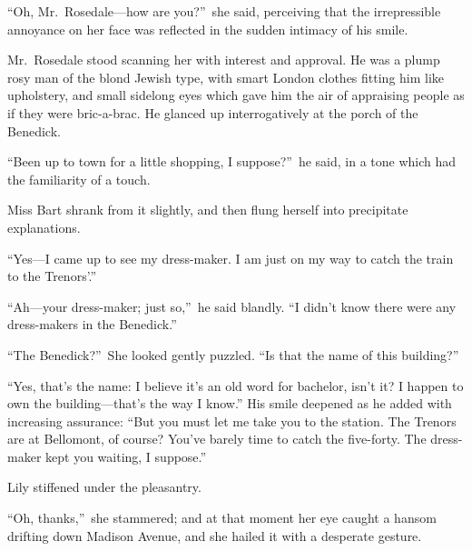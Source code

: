 \documentclass[12pt,a4paper]{book}
\begin{document}
``Oh, Mr.\ Rosedale---how are you?''\ she said, perceiving that the
irrepressible annoyance on her face was reflected in the sudden
intimacy of his smile.





Mr.\ Rosedale stood scanning her with interest and approval. He
was a plump rosy man of the blond Jewish type, with smart London
clothes fitting him like upholstery, and small sidelong eyes
which gave him the air of appraising people as if they were
bric-a-brac. He glanced up interrogatively at the porch of the
Benedick.





``Been up to town for a little shopping, I suppose?''\ he said, in a
tone which had the familiarity of a touch.





Miss Bart shrank from it slightly, and then flung herself into
precipitate explanations.





``Yes---I came up to see my dress-maker. I am just on my way to
catch the train to the Trenors'.''





``Ah---your dress-maker; just so,''\ he said blandly. ``I didn't know
there were any dress-makers in the Benedick.''





``The Benedick?''\ She looked gently puzzled. ``Is that the name of
this building?''





``Yes, that's the name: I believe it's an old word for bachelor,
isn't it? I happen to own the building---that's the way I know.'' 
His smile deepened as he added with increasing assurance: ``But
you must let me take you to the station. The Trenors are at
Bellomont, of course? You've barely time to catch the five-forty. 
The dress-maker kept you waiting, I suppose.''





Lily stiffened under the pleasantry.





``Oh, thanks,''\ she stammered; and at that moment her eye caught a
hansom drifting down Madison Avenue, and she hailed it with a
desperate gesture.
\end{document}
